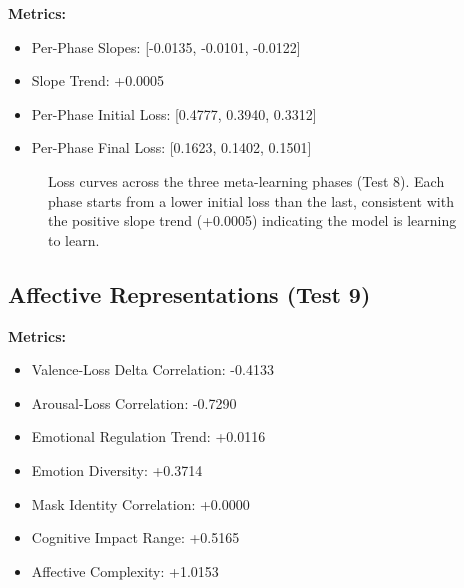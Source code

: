\documentclass[12pt]{article}
\begin{document}
\textbf{Metrics:}
\begin{itemize}
    \item Per-Phase Slopes: [-0.0135, -0.0101, -0.0122]
    \item Slope Trend: +0.0005
    \item Per-Phase Initial Loss: [0.4777, 0.3940, 0.3312]
    \item Per-Phase Final Loss: [0.1623, 0.1402, 0.1501]
\end{itemize}

\begin{figure}[H]
\centering
{}
\caption{Loss curves across the three meta-learning phases (Test 8).
Each phase starts from a lower initial loss than the last, consistent
with the positive slope trend (+0.0005) indicating the model is
learning to learn.}
\label{fig:meta}
\end{figure}

\subsection{Affective Representations (Test 9)}
\label{subsec:test9}

\textbf{Metrics:}
\begin{itemize}
    \item Valence-Loss Delta Correlation: -0.4133
    \item Arousal-Loss Correlation: -0.7290
    \item Emotional Regulation Trend: +0.0116
    \item Emotion Diversity: +0.3714
    \item Mask Identity Correlation: +0.0000
    \item Cognitive Impact Range: +0.5165
    \item Affective Complexity: +1.0153
\end{itemize}
\end{document}
